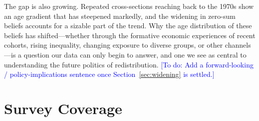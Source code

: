 \documentclass[11pt, headsepline]{article}
\newcommand{\todo}[1]{\noindent\textcolor{blue}{[To do: #1]}}
\begin{document}
The gap is also growing. Repeated cross-sections reaching back to the 1970s show an age gradient that has steepened markedly, and the widening in zero-sum beliefs accounts for a sizable part of the trend. Why the age distribution of these beliefs has shifted---whether through the formative economic experiences of recent cohorts, rising inequality, changing exposure to diverse groups, or other channels---is a question our data can only begin to answer, and one we see as central to understanding the future politics of redistribution. \todo{Add a forward-looking / policy-implications sentence once Section~\ref{sec:widening} is settled.}



\newpage
\appendix
\renewcommand{\thetable}{A.\arabic{table}}
\setcounter{table}{0}
\section{Survey Coverage}\label{app:coverage}
\end{document}
